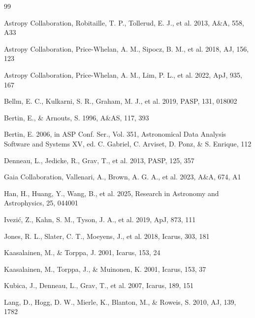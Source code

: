 \documentclass[referee]{raa}
\begin{document}
\begin{thebibliography}{99}

Astropy Collaboration, Robitaille, T. P., Tollerud, E. J., et al. 2013, A\&A, 558, A33

Astropy Collaboration, Price-Whelan, A. M., Sipocz, B. M., et al. 2018, AJ, 156, 123

Astropy Collaboration, Price-Whelan, A. M., Lim, P. L., et al. 2022, ApJ, 935, 167

Bellm, E. C., Kulkarni, S. R., Graham, M. J., et al. 2019, PASP, 131, 018002

Bertin, E., \& Arnouts, S. 1996, A\&AS, 117, 393

Bertin, E. 2006, in ASP Conf. Ser., Vol. 351, Astronomical Data Analysis Software and Systems XV, ed. C. Gabriel, C. Arviset, D. Ponz, \& S. Enrique, 112

Denneau, L., Jedicke, R., Grav, T., et al. 2013, PASP, 125, 357

Gaia Collaboration, Vallenari, A., Brown, A. G. A., et al. 2023, A\&A, 674, A1

Han, H., Huang, Y., Wang, B., et al. 2025, Research in Astronomy and Astrophysics, 25, 044001

Ivezi\'c, Z., Kahn, S. M., Tyson, J. A., et al. 2019, ApJ, 873, 111

Jones, R. L., Slater, C. T., Moeyens, J., et al. 2018, Icarus, 303, 181

Kaasalainen, M., \& Torppa, J. 2001, Icarus, 153, 24

Kaasalainen, M., Torppa, J., \& Muinonen, K. 2001, Icarus, 153, 37

Kubica, J., Denneau, L., Grav, T., et al. 2007, Icarus, 189, 151

Lang, D., Hogg, D. W., Mierle, K., Blanton, M., \& Roweis, S. 2010, AJ, 139, 1782


\end{thebibliography}
\end{document}
